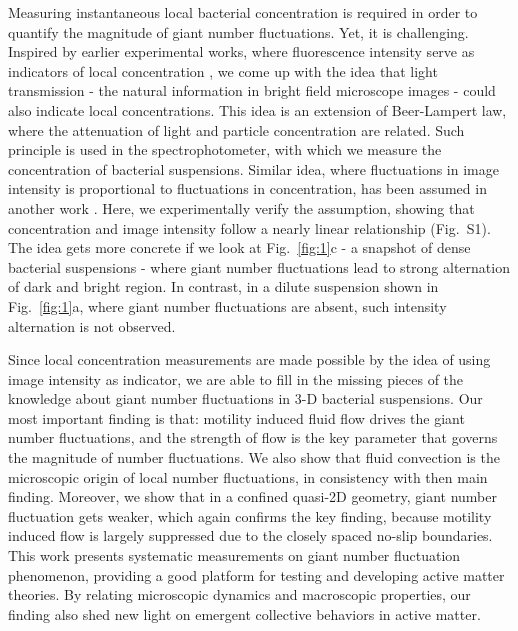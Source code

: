 \documentclass[twocolumn,aps,pre,amsmath,amssymb,floatfix,longbibliography]{revtex4-1}
\begin{document}
Measuring instantaneous local bacterial concentration is required in order to quantify the magnitude of giant number fluctuations. Yet, it is challenging. Inspired by earlier experimental works, where fluorescence intensity serve as indicators of local concentration \cite{Schaller4488}, we come up with the idea that light transmission - the natural information in bright field microscope images - could also indicate local concentrations. This idea is an extension of Beer-Lampert law, where the attenuation of light and particle concentration are related. Such principle is used in the spectrophotometer, with which we measure the concentration of bacterial suspensions. Similar idea, where fluctuations in image intensity is proportional to fluctuations in concentration, has been assumed in another work \cite{PhysRevLett.106.018101}. Here, we experimentally verify the assumption, showing that concentration and image intensity follow a nearly linear relationship (Fig.~S1). The idea gets more concrete if we look at Fig.~\ref{fig:1}c - a snapshot of dense bacterial suspensions - where giant number fluctuations lead to strong alternation of dark and bright region. In contrast, in a dilute suspension shown in Fig.~\ref{fig:1}a, where giant number fluctuations are absent, such intensity alternation is not observed.

Since local concentration measurements are made possible by the idea of using image intensity as indicator, we are able to fill in the missing pieces of the knowledge about giant number fluctuations in 3-D bacterial suspensions. Our most important finding is that: motility induced fluid flow drives the giant number fluctuations, and the strength of flow is the key parameter that governs the magnitude of number fluctuations. We also show that fluid convection is the microscopic origin of local number fluctuations, in consistency with then main finding. Moreover, we show that in a confined quasi-2D geometry, giant number fluctuation gets weaker, which again confirms the key finding, because motility induced flow is largely suppressed due to the closely spaced no-slip boundaries. This work presents systematic measurements on giant number fluctuation phenomenon, providing a good platform for testing and developing active matter theories. By relating microscopic dynamics and macroscopic properties, our finding also shed new light on emergent collective behaviors in active matter.
%
\end{document}
